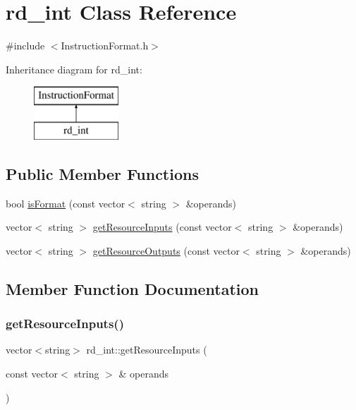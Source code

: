 \hypertarget{classrd__int}{}\section{rd\+\_\+int Class Reference}
\label{classrd__int}


{\ttfamily \#include $<$Instruction\+Format.\+h$>$}

Inheritance diagram for rd\+\_\+int\+:\begin{figure}[H]
\begin{center}
\leavevmode
\includegraphics[height=2.000000cm]{classrd__int}
\end{center}
\end{figure}
\subsection*{Public Member Functions}
\begin{DoxyCompactItemize}
\item 
bool \hyperlink{classrd__int_aded49d47c21e49d1f71a9531d1c600b2}{is\+Format} (const vector$<$ string $>$ \&operands)
\item 
vector$<$ string $>$ \hyperlink{classrd__int_a9c533c36eeee420c88f0bd7fbf631d9d}{get\+Resource\+Inputs} (const vector$<$ string $>$ \&operands)
\item 
vector$<$ string $>$ \hyperlink{classrd__int_a3728611aa3701f90fdaca2e63198ff80}{get\+Resource\+Outputs} (const vector$<$ string $>$ \&operands)
\end{DoxyCompactItemize}


\subsection{Member Function Documentation}
\mbox{\label{classrd__int_a9c533c36eeee420c88f0bd7fbf631d9d}} 
\subsubsection{\texorpdfstring{get\+Resource\+Inputs()}{getResourceInputs()}}
{\footnotesize\ttfamily vector$<$string$>$ rd\+\_\+int\+::get\+Resource\+Inputs (\begin{DoxyParamCaption}\item[{const vector$<$ string $>$ \&}]{operands }\end{DoxyParamCaption})\hspace{0.3cm}{\ttfamily [virtual]}}

